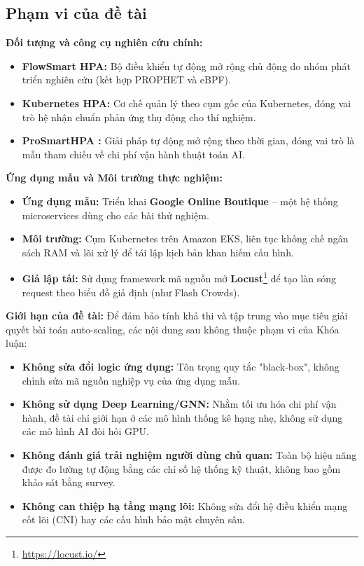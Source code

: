 \documentclass[14pt]{article}
\begin{document}
\subsection{Phạm vi của đề tài}

\noindent\textbf{Đối tượng và công cụ nghiên cứu chính:}
\begin{itemize}[leftmargin=1.5cm, label=\textbullet]
    \item \textbf{FlowSmart HPA:} Bộ điều khiển tự động mở rộng chủ động do nhóm phát triển nghiên cứu (kết hợp PROPHET và eBPF).
    \item \textbf{Kubernetes HPA:} Cơ chế quản lý theo cụm gốc của Kubernetes, đóng vai trò hệ nhận chuẩn phản ứng thụ động cho thí nghiệm.
    \item \textbf{ProSmartHPA \cite{ahmad2025towards}:} Giải pháp tự động mở rộng theo thời gian, đóng vai trò là mẫu tham chiếu về chi phí vận hành thuật toán AI.
\end{itemize}

\noindent\textbf{Ứng dụng mẫu và Môi trường thực nghiệm:}
\begin{itemize}[leftmargin=1.5cm, label=\textbullet]
    \item \textbf{Ứng dụng mẫu:} Triển khai \textbf{Google Online Boutique} -- một hệ thống microservices dùng cho các bài thử nghiệm.
    \item \textbf{Môi trường:} Cụm Kubernetes trên Amazon EKS, liên tục khống chế ngân sách RAM và lõi xử lý để tái lập kịch bản khan hiếm cấu hình.
       \item \textbf{Giả lập tải:} Sử dụng framework mã nguồn mở \textbf{Locust}\footnote{\url{https://locust.io/}} để tạo làn sóng request theo biểu đồ giả định (như Flash Crowds).

\end{itemize}

\noindent\textbf{Giới hạn của đề tài:}
Để đảm bảo tính khả thi và tập trung vào mục tiêu giải quyết bài toán auto-scaling, các nội dung sau không thuộc phạm vi của Khóa luận:
\begin{itemize}[leftmargin=1.5cm, label=\textbullet]
    \item \textbf{Không sửa đổi logic ứng dụng:} Tôn trọng quy tắc "black-box", không chỉnh sửa mã nguồn nghiệp vụ của ứng dụng mẫu.
    \item \textbf{Không sử dụng Deep Learning/GNN:} Nhằm tối ưu hóa chi phí vận hành, đề tài chỉ giới hạn ở các mô hình thống kê hạng nhẹ, không sử dụng các mô hình AI đòi hỏi GPU.
    \item \textbf{Không đánh giá trải nghiệm người dùng chủ quan:} Toàn bộ hiệu năng được đo lường tự động bằng các chỉ số hệ thống kỹ thuật, không bao gồm khảo sát bằng survey.
    \item \textbf{Không can thiệp hạ tầng mạng lõi:} Không sửa đổi hệ điều khiển mạng cốt lõi (CNI) hay các cấu hình bảo mật chuyên sâu.
\end{itemize}
\end{document}
